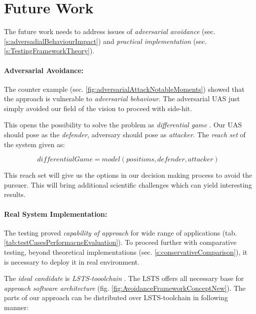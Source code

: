 \setcounter{chapter}{8}
\setcounter{section}{3}
\setcounter{subsection}{0}
\section{Future Work}\label{s:futureWork}

\noindent The future work needs to address issues of \emph{adversarial avoidance} (sec. \ref{s:adversadialBehaviourImpact}) and \emph{practical implementation} (sec. \ref{s:TestingFrameworkTheory}).

\paragraph{Adversarial Avoidance:} The counter example (sec. \ref{fig:adversarialAttackNotableMoments}) showed that the approach is vulnerable to \emph{adversarial behaviour}. The adversarial UAS just simply avoided our field of the vision to proceed with side-hit.

This opens the possibility to solve the problem as \emph{differential game} \cite{game1987,game1988}. Our UAS should pose as the \emph{defender}, adversary should pose as \emph{attacker}. The \emph{reach set} of the system given as:

\begin{equation*}
    differential Game = model(positions, defender, attacker)
\end{equation*}

\noindent This reach set  will give us the options in our decision making process to avoid the pursuer. This will bring additional scientific challenges which can yield interesting results.

\paragraph{Real System Implementation:} The testing proved \emph{capability of approach} for wide range of applications (tab. \ref{tab:testCasesPerformacneEvaluation}). To proceed further with comparative testing, beyond theoretical implementations (sec. \ref{s:conservativeComparison}), it is necessary to deploy it in real environment.

The \emph{ideal candidate} is \emph{LSTS-tooolchain} \cite{pinto2013lsts}. The LSTS offers all necessary base for \emph{approach software architecture} (fig. \ref{fig:AvoidanceFrameworkConceptNew}). The parts of our approach can be distributed over LSTS-toolchain in following manner:

